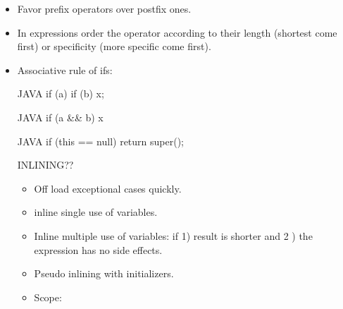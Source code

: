 \begin{itemize}
  \item Favor prefix operators over postfix ones.
  \item In expressions order the operator according to their length (shortest
        come first) or specificity (more specific come first).
  \item Associative rule of ifs:
        \begin{code}{JAVA}
if (a) if (b) x;
  \end{code}
  \begin{code}{JAVA}
if (a && b) x
  \end{code}
  \begin{code}{JAVA}
if (this == null) return super();
  \end{code}


  INLINING??
  \begin{itemize}
    \item Off load exceptional cases quickly.
    \item inline single use of variables.
    \item Inline multiple use of variables: if 1) result is shorter and 2
          ) the expression has no side effects.
    \item Pseudo inlining with initializers.
    \item Scope:
  \end{itemize}


\end{itemize}
